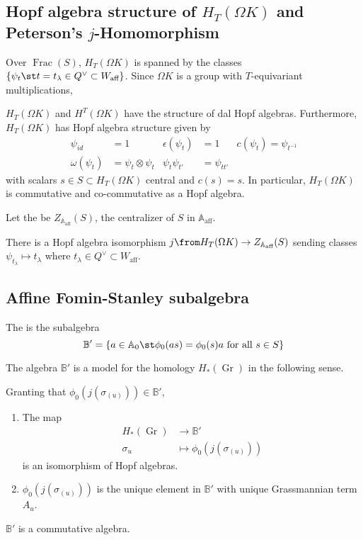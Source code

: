 \documentclass[11pt,leqno,oneside]{amsart}
\numberwithin{thm}{section}
\renewcommand{\W}{W}
\newcommand{\Waff}{\W_{\text{aff}}}
\newcommand{\A}{\mathbb{A}}
\newcommand{\Aaff}{\A_{\text{aff}}}
\newcommand{\B}{\mathbb{B}}
\newcommand{\Gr}{\operatorname{Gr}}
\DeclareMathOperator{\Frac}{Frac}
\begin{document}
\subsection{Hopf algebra structure of \(H_T(\Omega K)\) and Peterson's \(j\)-Homomorphism}
Over \(\Frac(S)\), \(H_T(\Omega K)\) is spanned by the classes
\(\{\psi_t \st t = t_\lambda \in Q^\vee \subset \Waff\}\). Since
\(\Omega K\) is a group with \(T\)-equivariant multiplications,
\begin{prop}
  \(H_T(\Omega K)\) and \(H^T(\Omega K)\) have the structure of dal
  Hopf algebras. Furthermore, \(H_T(\Omega K)\) has Hopf algebra
  structure given by
  \begin{align*}
    \psi_{id} & = 1& \epsilon(\psi_t) & = 1& c(\psi_t) = \psi_{t^{-1}} \\
    \omega(\psi_t) & = \psi_t \otimes \psi_t & \psi_t \psi_{t'} &=
                                             \psi_{tt'}
  \end{align*}
  with scalars \(s \in S \subset H_T(\Omega K)\) central and \(c(s) =
  s\). In particular, \(H_T(\Omega K)\) is commutative and
  co-commutative as a Hopf algebra.
\end{prop}
\begin{defn}
  Let the  be \(Z_{\Aaff}(S)\), the
  centralizer of \(S\) in \(\Aaff\).
\end{defn}
\begin{prop}
  There is a Hopf algebra isomorphism \(j \from H_T(\Omega K) \to
  Z_{\Aaff}(S)\) sending classes \(\psi_{t_\lambda} \mapsto
  t_\lambda\) where \(t_\lambda \in Q^\vee \subset \Waff\).
\end{prop}
\subsection{Affine Fomin-Stanley subalgebra}
\begin{defn}
  The  is the subalgebra \[
    \B' = \{a \in \A_0 \st \phi_0(as) = \phi_0(s)a \text{ for all }s
    \in S\}
  \]
\end{defn}
The algebra \(\B'\) is a model for the homology \(H_*(\Gr)\) in the
following sense.
\begin{prop}\label{affine-fomin-stanley-isom-to-homology}
  Granting that \(\phi_0(j(\sigma_{(u)})) \in \B'\),
  \begin{enumerate}
  \item The map
    \begin{align*}
      H_*(\Gr) & \to \B' \\
      \sigma_u & \mapsto \phi_0(j(\sigma_{(u)}))
    \end{align*}
    is an isomorphism of Hopf algebras.
  \item \(\phi_0(j(\sigma_{(u)}))\) is the unique element in \(\B'\)
    with unique Grassmannian term \(A_u\).
  \end{enumerate}
\end{prop}
\begin{cor}
  \(\B'\) is a commutative algebra.
\end{cor}
\end{document}
